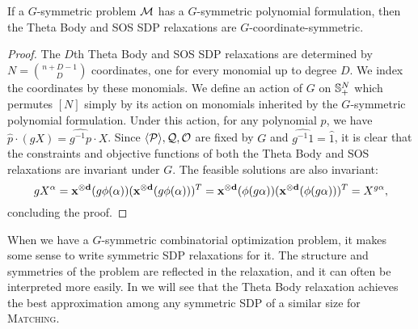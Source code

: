 \begin{lemma}
If a $G$-symmetric problem $\mathcal M$ has a $G$-symmetric polynomial formulation, then the Theta Body and SOS SDP relaxations are $G$-coordinate-symmetric.
\end{lemma}
\begin{proof}
The $D$th Theta Body and SOS SDP relaxations are determined by $N = \binom{n+D-1}{D}$ coordinates, one for every monomial up to degree $D$. We index the coordinates by these monomials. We define an action of $G$ on $\mathbb{S}^{N}_+$ which permutes $[N]$ simply by its action on monomials inherited by the $G$-symmetric polynomial formulation. Under this action, for any polynomial $p$, we have $\hat{p}\cdot (gX) = \widehat{g^{-1}p} \cdot X$. Since $\langle \mathcal P \rangle,\mathcal Q,\mathcal O$ are fixed by $G$ and $\widehat{g^{-1}1} = \hat{1}$, it is clear that the constraints and objective functions of both the Theta Body and SOS relaxations are invariant under $G$. The feasible solutions are also invariant:
\[gX^\alpha = \mathbf{x^{\otimes d}}(g\phi(\alpha))(\mathbf{x^{\otimes d}}(g\phi(\alpha)))^T = \mathbf{x^{\otimes d}}(\phi(g\alpha))(\mathbf{x^{\otimes d}}(\phi(g\alpha)))^T = X^{g\alpha},\]
concluding the proof.
\end{proof}

When we have a $G$-symmetric combinatorial optimization problem, it makes some sense to write symmetric SDP relaxations for it.
The structure and symmetries of the problem are reflected in the relaxation, and it can often be interpreted more easily.
In  we will see that the Theta Body relaxation achieves the best approximation among any symmetric SDP of a similar size for \textsc{Matching}.
